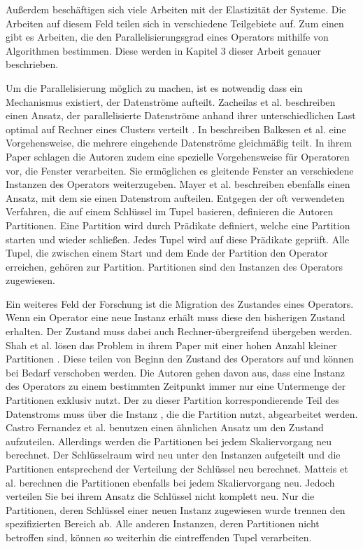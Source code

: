 Außerdem beschäftigen sich viele Arbeiten mit der Elastizität der Systeme.
Die Arbeiten auf diesem Feld teilen sich in verschiedene Teilgebiete auf.
Zum einen gibt es Arbeiten, die den Parallelisierungsgrad eines Operators mithilfe von Algorithmen bestimmen. Diese werden in Kapitel 3 dieser Arbeit genauer beschrieben.

Um die Parallelisierung möglich zu machen, ist es notwendig dass ein Mechanismus existiert, der Datenströme aufteilt.
Zacheilas et al. beschreiben einen Ansatz, der parallelisierte Datenströme anhand ihrer unterschiedlichen Last optimal auf Rechner eines Clusters verteilt \cite{zacheilas_dynamic_2016}.
In \cite{balkesen_adaptive_2013} beschreiben Balkesen et al. eine Vorgehensweise, die mehrere eingehende Datenströme gleichmäßig teilt.
In ihrem Paper schlagen die Autoren zudem eine spezielle Vorgehensweise für Operatoren vor, die Fenster verarbeiten.
Sie ermöglichen es gleitende Fenster an verschiedene Instanzen des Operators weiterzugeben.
Mayer et al. \cite{mayer_predictable_2015} beschreiben ebenfalls einen Ansatz, mit dem sie einen Datenstrom aufteilen.
Entgegen der oft verwendeten Verfahren, die auf einem Schlüssel im Tupel basieren, definieren die Autoren Partitionen.
Eine Partition wird durch Prädikate definiert, welche eine Partition starten und wieder schließen.
Jedes Tupel wird auf diese Prädikate geprüft.
Alle Tupel, die zwischen einem Start und dem Ende der Partition den Operator erreichen, gehören zur Partition.
Partitionen sind den Instanzen des Operators zugewiesen.

Ein weiteres Feld der Forschung ist die Migration des Zustandes eines Operators.
Wenn ein Operator eine neue Instanz erhält muss diese den bisherigen Zustand erhalten.
Der Zustand muss dabei auch Rechner-übergreifend übergeben werden.
Shah et al. lösen das Problem in ihrem Paper mit einer hohen Anzahl kleiner Partitionen \cite{shah_flux:_2003}.
Diese teilen von Beginn den Zustand des Operators auf und können bei Bedarf verschoben werden.
Die Autoren gehen davon aus, dass eine Instanz des Operators zu einem bestimmten Zeitpunkt immer nur eine Untermenge der Partitionen exklusiv nutzt.
Der zu dieser Partition korrespondierende Teil des Datenstroms muss über die Instanz , die die Partition nutzt, abgearbeitet werden.
Castro Fernandez et al. \cite{castro_fernandez_integrating_2013} benutzen einen ähnlichen Ansatz um den Zustand aufzuteilen.
Allerdings werden die Partitionen bei jedem Skaliervorgang neu berechnet.
Der Schlüsselraum wird neu unter den Instanzen aufgeteilt und die Partitionen entsprechend der Verteilung der Schlüssel neu berechnet.
Matteis et al. \cite{de_matteis_keep_2016} berechnen die Partitionen ebenfalls bei jedem Skaliervorgang neu.
Jedoch verteilen Sie bei ihrem Ansatz die Schlüssel nicht komplett neu.
Nur die Partitionen, deren Schlüssel einer neuen Instanz zugewiesen wurde trennen den spezifizierten Bereich ab.
Alle anderen Instanzen, deren Partitionen nicht betroffen sind, können so weiterhin die eintreffenden Tupel verarbeiten.

